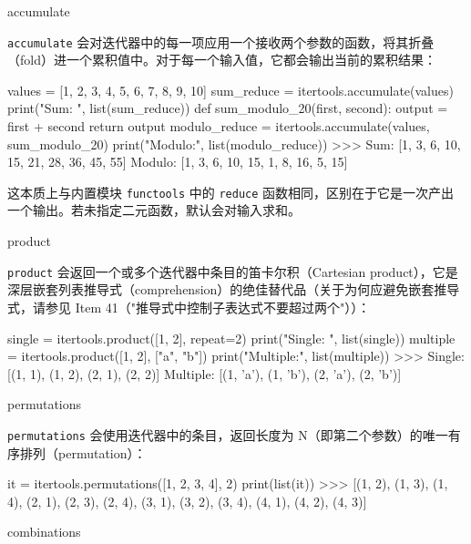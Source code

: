 \begin{codebox}[python]
accumulate
\end{codebox}

\texttt{accumulate} 会对迭代器中的每一项应用一个接收两个参数的函数，将其折叠（fold）进一个累积值中。对于每一个输入值，它都会输出当前的累积结果：

\begin{codebox}[python]
values = [1, 2, 3, 4, 5, 6, 7, 8, 9, 10]
sum_reduce = itertools.accumulate(values)
print("Sum:   ", list(sum_reduce))
def sum_modulo_20(first, second):
    output = first + second
    return output %
modulo_reduce = itertools.accumulate(values, sum_modulo_20)
print("Modulo:", list(modulo_reduce))
>>>
Sum:    [1, 3, 6, 10, 15, 21, 28, 36, 45, 55]
Modulo: [1, 3, 6, 10, 15, 1, 8, 16, 5, 15]
\end{codebox}

这本质上与内置模块 \texttt{functools} 中的 \texttt{reduce} 函数相同，区别在于它是一次产出一个输出。若未指定二元函数，默认会对输入求和。

\begin{codebox}[python]
product
\end{codebox}

\texttt{product} 会返回一个或多个迭代器中条目的笛卡尔积（Cartesian product），它是深层嵌套列表推导式（comprehension）的绝佳替代品（关于为何应避免嵌套推导式，请参见 Item 41（"推导式中控制子表达式不要超过两个"））：

\begin{codebox}[python]
single = itertools.product([1, 2], repeat=2)
print("Single:  ", list(single))
multiple = itertools.product([1, 2], ["a", "b"])
print("Multiple:", list(multiple))
>>>
Single:   [(1, 1), (1, 2), (2, 1), (2, 2)]
Multiple: [(1, 'a'), (1, 'b'), (2, 'a'), (2, 'b')]
\end{codebox}

\begin{codebox}[python]
permutations
\end{codebox}

\texttt{permutations} 会使用迭代器中的条目，返回长度为 N（即第二个参数）的唯一有序排列（permutation）：

\begin{codebox}[python]
it = itertools.permutations([1, 2, 3, 4], 2)
print(list(it))
>>>
[(1, 2),
 (1, 3),
 (1, 4),
 (2, 1),
 (2, 3),
 (2, 4),
 (3, 1),
 (3, 2),
 (3, 4),
 (4, 1),
 (4, 2),
 (4, 3)]
\end{codebox}

\begin{codebox}[python]
combinations
\end{codebox}

